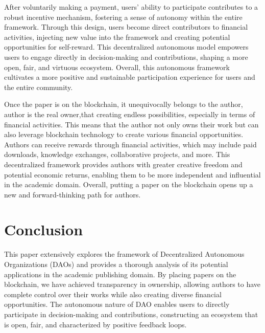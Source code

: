\documentclass[lettersize,journal]{IEEEtran}
\begin{document}
After voluntarily making a payment, users' ability to participate contributes to a robust incentive mechanism, fostering a sense of autonomy within the entire framework. Through this design, users become direct contributors to financial activities, injecting new value into the framework and creating potential opportunities for self-reward. This decentralized autonomous model empowers users to engage directly in decision-making and contributions, shaping a more open, fair, and virtuous ecosystem. Overall, this autonomous framework cultivates a more positive and sustainable participation experience for users and the entire community.

Once the paper is on the blockchain, it unequivocally belongs to the author, author is the real owner,that creating endless possibilities, especially in terms of financial activities. This means that the author not only owns their work but can also leverage blockchain technology to create various financial opportunities. Authors can receive rewards through financial activities, which may include paid downloads, knowledge exchanges, collaborative projects, and more. This decentralized framework provides authors with greater creative freedom and potential economic returns, enabling them to be more independent and influential in the academic domain. Overall, putting a paper on the blockchain opens up a new and forward-thinking path for authors.

\section{Conclusion}
This paper extensively explores the framework of Decentralized Autonomous Organizations (DAOs) and provides a thorough analysis of its potential applications in the academic publishing domain. By placing papers on the blockchain, we have achieved transparency in ownership, allowing authors to have complete control over their works while also creating diverse financial opportunities. The autonomous nature of DAO enables users to directly participate in decision-making and contributions, constructing an ecosystem that is open, fair, and characterized by positive feedback loops.
\end{document}
